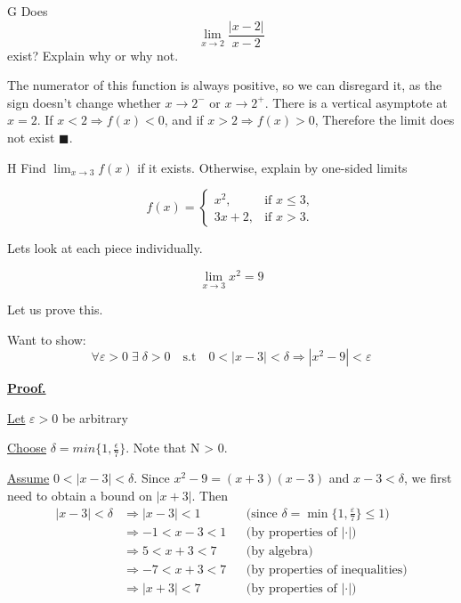 \documentclass[]{article}
\begin{document}
\begin{question}{G}
    Does
    \[
    \lim_{x \to 2} \frac{|x-2|}{x-2}
    \]
    exist? Explain why or why not.  
\end{question}

The numerator of this function is always positive, so we can disregard it, as the sign doesn't change whether $x \to 2^-$ or $x \to 2^+$. There is a vertical asymptote at $x = 2$. If $x < 2 \Rightarrow f(x) < 0$, and if $x > 2 \Rightarrow f(x) > 0$, Therefore the limit does not exist $\blacksquare$. 
\begin{question}{H}
    Find $\displaystyle{\lim_{x\to 3}} f(x)$ if it exists. Otherwise, explain by one-sided limits
    
    \[
        f(x) =
        \begin{cases}
            x^2, & \text{if } x \leq 3, \\
            3x + 2, & \text{if } x > 3.
        \end{cases}
    \]

\end{question}

Lets look at each piece individually.

\[
    \lim_{x\to3} x^2 = 9
\]

Let us prove this.

Want to show: 
\[
    \forall \varepsilon > 0\;\exists\;\delta >0 \quad \text{s.t} \quad 
    0 < |x-3| < \delta \Longrightarrow |x^2-9| < \varepsilon
\]

\underline{\bf{Proof.}}

\underline{Let} $\varepsilon > 0$ be arbitrary

\medbreak

\underline{Choose} $\delta = min\{1, \frac{\epsilon}{7}\} $. Note that N > 0.

\medbreak

\underline{Assume} $0 < |x-3| < \delta$.
\medbreak
Since $x^2 - 9 = (x+3)(x-3)$ and $x-3 < \delta$, we first need to obtain a bound on $|x+3|$. Then
\begin{align*}
    |x-3| < \delta &\Longrightarrow |x-3|<1
        && \text{(since $\delta = \min\{ 1, \frac{\varepsilon}{7} \} \le 1$)} \\[6pt]
    &\Longrightarrow -1 < x-3 < 1
        && \text{(by properties of $|\cdot|$)} \\[6pt]
    &\Longrightarrow 5 < x+3 < 7 
        && \text{(by algebra)} \\[6pt]
    &\Longrightarrow -7 < x+3 < 7
        &&\text{(by properties of inequalities)} \\[6pt]
    &\Longrightarrow |x+3| < 7
        &&\text{(by properties of $|\cdot|$)} \\[6pt]
\end{align*}
\end{document}
